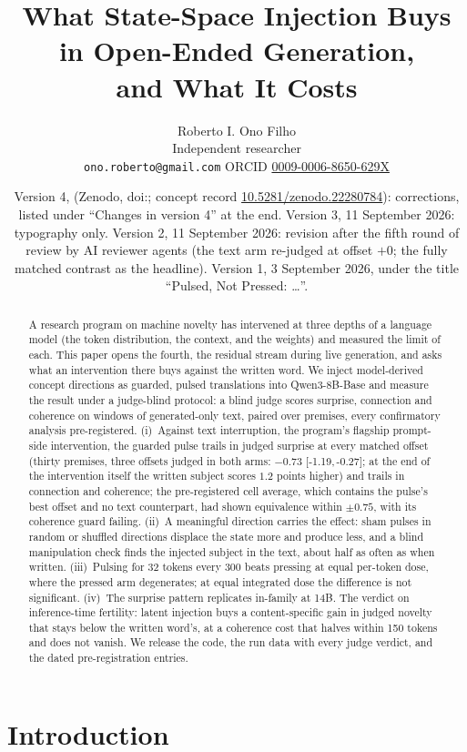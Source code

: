 \documentclass[11pt]{article}
\title{What State-Space Injection Buys in Open-Ended Generation,\\ and What It Costs}
\author{Roberto I. Ono Filho\\ Independent researcher\\
\texttt{ono.roberto@gmail.com} \quad ORCID \href{https://orcid.org/0009-0006-8650-629X}{0009-0006-8650-629X}}
\date{\small Version 4, \versiondate{} (Zenodo, doi:\href{https://doi.org/\thisdoi}{\thisdoi}; concept record \href{https://doi.org/10.5281/zenodo.22280784}{10.5281/zenodo.22280784}): corrections, listed under ``Changes in version 4'' at the end. Version 3, 11 September 2026: typography only. Version 2, 11 September 2026: revision after the fifth round of review by AI reviewer agents (the text arm re-judged at offset $+0$; the fully matched contrast as the headline). Version 1, 3 September 2026, under the title ``Pulsed, Not Pressed: \ldots''.}
\newcommand{\ci}[2]{[#1,\,#2]}
\begin{document}
\maketitle

\begin{abstract}
A research program on machine novelty has intervened at three depths of
a language model (the token distribution, the context, and the
weights) and measured the limit of each. This paper opens the fourth,
the residual stream during live generation, and asks what an
intervention there buys against the written word. We inject
model-derived concept directions as guarded, pulsed translations into
Qwen3-8B-Base and measure the result under a judge-blind protocol: a
blind judge scores surprise, connection and coherence on windows of
generated-only text, paired over premises, every confirmatory analysis
pre-registered. (i)~Against text interruption, the program's flagship
prompt-side intervention, the guarded pulse trails in judged
surprise at every matched offset (thirty premises, three offsets judged
in both arms: $-0.73$ \ci{-1.19}{-0.27}; at the end of the intervention
itself the written subject scores $1.2$ points higher) and trails in
connection and coherence; the pre-registered cell average, which
contains the pulse's best offset and no text counterpart, had shown
equivalence within $\pm0.75$, with its coherence guard failing.
(ii)~A meaningful direction carries the effect: sham pulses in random
or shuffled directions displace the state more and produce less, and a
blind manipulation check finds the injected subject in the text, about
half as often as when written. (iii)~Pulsing for 32 tokens every 300
beats pressing at equal per-token dose, where the pressed arm
degenerates; at equal integrated dose the difference is not
significant. (iv)~The surprise pattern replicates in-family at 14B. The
verdict on inference-time fertility: latent injection buys a
content-specific gain in judged novelty that stays below the written
word's, at a coherence cost that halves within 150 tokens and does not
vanish. We release the code, the run data with every judge verdict, and
the dated pre-registration entries.
\end{abstract}

\section{Introduction}
\label{sec:intro}
\end{document}
